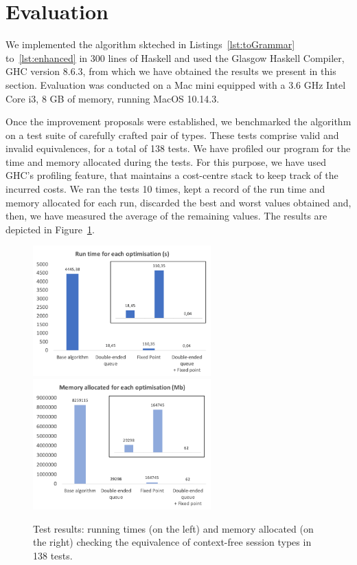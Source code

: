 \section{Evaluation}
\label{sec:evaluation}


We implemented the algorithm skteched in Listings~\ref{lst:toGrammar}
to~\ref{lst:enhanced} in 300 lines of Haskell and used the Glasgow
Haskell Compiler, GHC version 8.6.3, from which we have obtained the
results we present in this section.  Evaluation was conducted on a Mac
mini equipped with a 3.6 GHz Intel Core i3, 8 GB of memory, running
MacOS 10.14.3.

Once the improvement proposals were established, we benchmarked the
algorithm on a test suite of carefully crafted pair of types. These
tests comprise valid and invalid equivalences, for a total of 138
tests. We have profiled our program for the time and memory allocated
during the tests. For this purpose, we have used GHC's profiling
feature, that maintains a cost-centre stack to keep track of the
incurred costs. We ran the tests 10 times, kept a record of the run
time and memory allocated for each run, discarded the best and worst
values obtained and, then, we have measured the average of the
remaining values. The results are depicted in
Figure~\ref{fig:results}.

\begin{figure}[h]
	\includegraphics[height=5cm]{img/run_time}	\enspace
	\includegraphics[height=5cm]{img/memory_alloc}
	\caption{Test results: running times (on the left) and
	memory allocated (on the right) checking the equivalence
	of context-free session types in 138 tests.}
	\label{fig:results}
\end{figure}

